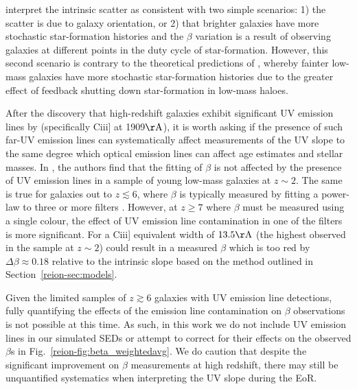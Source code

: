 \citeauthor{Rogers:2014bn} interpret the intrinsic scatter as consistent with two simple scenarios: 1) the scatter is due to galaxy orientation, or 2) that brighter galaxies have more stochastic star-formation histories and the $\beta$ variation is a result of observing galaxies at different points in the duty cycle of star-formation. However, this second scenario is contrary to the theoretical predictions of \citet{Dayal:2013jm}, whereby fainter low-mass galaxies have more stochastic star-formation histories due to the greater effect of feedback shutting down star-formation in low-mass haloes.
 
After the discovery that high-redshift galaxies exhibit significant UV emission lines by \citet{2015MNRAS.450.1846S} (specifically {\sc Ciii]} at 1909$\rm{\AA}$), it is worth asking if the presence of such far-UV emission lines can systematically affect measurements of the UV slope to the same degree which optical emission lines can affect age estimates and stellar masses. In \citet{Stark:2014fa}, the authors find that the fitting of $\beta$ is not affected by the presence of UV emission lines in a sample of young low-mass galaxies at $z\sim2$. The same is true for galaxies out to $z \lesssim 6$, where $\beta$ is typically measured by fitting a power-law to three or more filters \citep{Bouwens:2013vf}. However, at $z \geq 7$ where $\beta$ must be measured using a single colour, the effect of UV emission line contamination in one of the filters is more significant. For a {\sc Ciii]} equivalent width of $13.5\rm{\AA}$ (the highest observed in the \citet{Stark:2014fa} sample at $z\sim2$) could result in a measured $\beta$ which is too red by $\Delta\beta \approx 0.18$ relative to the intrinsic slope based on the method outlined in Section~\ref{reion-sec:models}. 

Given the limited samples of $z\gtrsim 6$ galaxies with UV emission line detections, fully quantifying the effects of the emission line contamination on $\beta$ observations is not possible at this time. As such, in this work we do not include UV emission lines in our simulated SEDs or attempt to correct for their effects on the observed $\beta$s in Fig.~\ref{reion-fig:beta_weightedavg}. We do caution that despite the significant improvement on  $\beta$ measurements at high redshift, there may still be unquantified systematics when interpreting the UV slope during the EoR.


